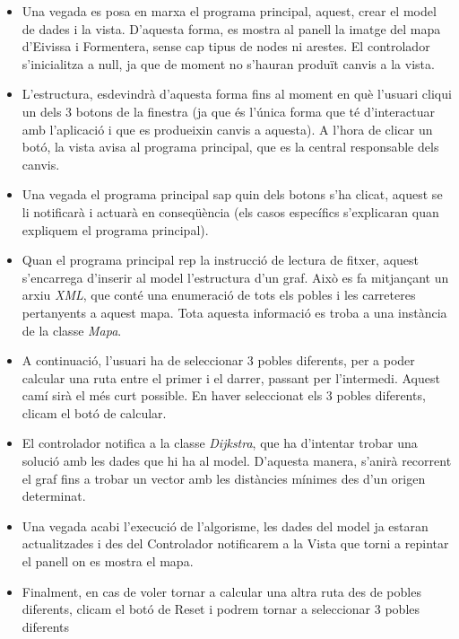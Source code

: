 \documentclass[conference]{IEEEtran}
\begin{document}
 \begin{itemize}
    \item Una vegada es posa en marxa el programa principal, aquest, crear el model de dades i la vista. D'aquesta forma, es mostra al panell la imatge del mapa d'Eivissa i Formentera, sense cap tipus de nodes ni arestes. El controlador s'inicialitza a null, ja que de moment no s'hauran produït canvis a la vista.\\

    \item L'estructura, esdevindrà d'aquesta forma fins al moment en què l'usuari cliqui un dels 3 botons de la finestra (ja que és l'única forma que té d'interactuar amb l'aplicació i que es produeixin canvis a aquesta). A l'hora de clicar un botó, la vista avisa al programa principal, que es la central responsable dels canvis.\\
    
    \item Una vegada el programa principal sap quin dels botons s'ha clicat, aquest se li notificarà i actuarà en conseqüència (els casos específics s'explicaran quan expliquem el programa principal).\\

    \item Quan el programa principal rep la instrucció de lectura de fitxer, aquest s'encarrega d'inserir al model l'estructura d'un graf. Això es fa mitjançant un arxiu \textit{XML}, que conté una enumeració de tots els pobles i les carreteres pertanyents a aquest mapa. Tota aquesta informació es troba a una instància de la classe \textit{Mapa}.\\

    \item A continuació, l'usuari ha de seleccionar 3 pobles diferents, per a poder calcular una ruta entre el primer i el darrer, passant per l'intermedi. Aquest camí sirà el més curt possible. En haver seleccionat els 3 pobles diferents, clicam el botó de calcular.\\
    
    \item El controlador notifica a la classe \textit{Dijkstra}, que ha d'intentar trobar una solució amb les dades que hi ha al model. D'aquesta manera, s'anirà recorrent el graf fins a trobar un vector amb les distàncies mínimes des d'un origen determinat.\\

    
    \item Una vegada acabi l'execució de l'algorisme, les dades del model ja estaran actualitzades i des del Controlador notificarem a la Vista que torni a repintar el panell on es mostra el mapa.\\


    \item Finalment, en cas de voler tornar a calcular una altra ruta des de pobles diferents, clicam el botó de Reset i podrem tornar a seleccionar 3 pobles diferents
\end{itemize}
\end{document}
